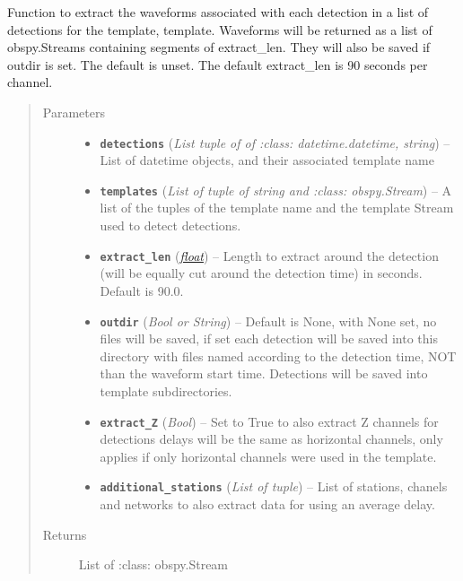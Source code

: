 \documentclass[a4paper,10pt,english]{sphinxmanual}
\begin{document}

\begin{fulllineitems}
\label{utils:clustering.extract_detections}
Function to extract the waveforms associated with each detection in a list
of detections for the template, template.  Waveforms will be returned as
a list of obspy.Streams containing segments of extract\_len.  They will also
be saved if outdir is set.  The default is unset.  The default extract\_len
is 90 seconds per channel.
\begin{quote}\begin{description}
\item[{Parameters}] \leavevmode\begin{itemize}
\item {} 
\textbf{\texttt{detections}} (\emph{List tuple of of :class: datetime.datetime, string}) -- List of datetime objects, and their associated template            name

\item {} 
\textbf{\texttt{templates}} (\emph{List of tuple of string and :class: obspy.Stream}) -- A list of the tuples of the template name and the template            Stream used to detect detections.

\item {} 
\textbf{\texttt{extract\_len}} (\href{https://docs.python.org/library/functions.html\#float}{\emph{float}}) -- Length to extract around the detection (will be equally            cut around the detection time) in seconds.  Default is 90.0.

\item {} 
\textbf{\texttt{outdir}} (\emph{Bool or String}) -- Default is None, with None set, no files will be saved,            if set each detection will be saved into this directory with files            named according to the detection time, NOT than the waveform            start time. Detections will be saved into template subdirectories.

\item {} 
\textbf{\texttt{extract\_Z}} (\emph{Bool}) -- Set to True to also extract Z channels for detections            delays will be the same as horizontal channels, only applies if            only horizontal channels were used in the template.

\item {} 
\textbf{\texttt{additional\_stations}} (\emph{List of tuple}) -- List of stations, chanels and networks to also            extract data for using an average delay.

\end{itemize}

\item[{Returns}] \leavevmode
List of :class: obspy.Stream

\end{description}\end{quote}

\end{fulllineitems}
\end{document}
